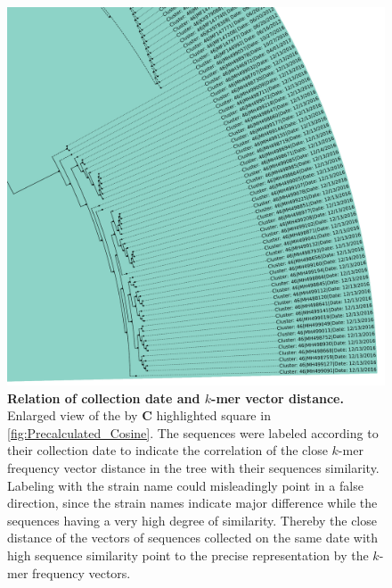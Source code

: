 \begin{figure}[!hbt]
    \centering
    \includegraphics[width=\textwidth]{Graphics/identical.pdf}
    \caption[Relation of collection date and $k$-mer vector distance]{\textbf{Relation of collection date and $k$-mer vector distance.} Enlarged view of the by \textbf{\textsf{C}} highlighted square in \autoref{fig:Precalculated_Cosine}. The sequences were labeled according to their collection date to indicate the correlation of the close $k$-mer frequency vector distance in the tree with their sequences similarity. Labeling with the strain name could misleadingly point in a false direction, since the strain names indicate major difference while the sequences having a very high degree of similarity. Thereby the close distance of the vectors of sequences collected on the same date with high sequence similarity point to the precise representation by the $k$-mer frequency vectors.}
    \label{fig:focus}
\end{figure}

\vspace{1em}

